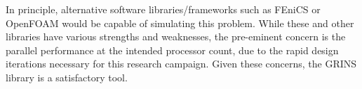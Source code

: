 In principle, alternative software libraries/frameworks such as
FEniCS\cite{AlnaesBlechta2015a} or OpenFOAM\cite{jasak2007openfoam}
would be capable of simulating this problem. While these and
other libraries have various strengths and weaknesses, the pre-eminent
concern is the parallel performance at the intended processor count, due
to the rapid design iterations necessary for this research
campaign. Given these concerns, the GRINS library is a satisfactory tool. 


